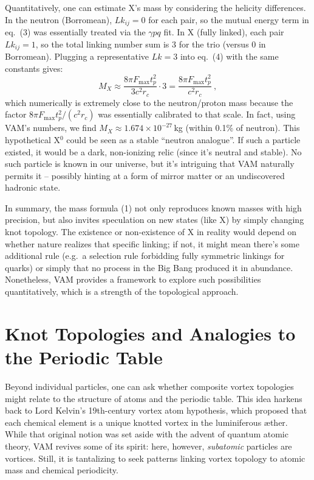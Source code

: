 \documentclass[a4paper,12pt]{article}
\begin{document}
        Quantitatively, one can estimate X's mass by considering the helicity differences. In the neutron (Borromean), $Lk_{ij}=0$ for each pair, so the mutual energy term in eq.~(3) was essentially treated via the $\gamma p q$ fit. In X (fully linked), each pair $Lk_{ij}=1$, so the total linking number sum is 3 for the trio (versus 0 in Borromean). Plugging a representative $Lk=3$ into eq.~(4) with the same constants gives:
        \[
        M_X \approx \frac{8\pi F_{\max} t_p^2}{3c^2 r_c} \cdot 3 = \frac{8\pi F_{\max} t_p^2}{c^2 r_c}~,
        \]
        which numerically is extremely close to the neutron/proton mass because the factor $8\pi F_{\max} t_p^2/(c^2 r_c)$ was essentially calibrated to that scale. In fact, using VAM's numbers, we find $M_X \approx 1.674\times10^{-27}$\,kg (within 0.1\% of neutron). This hypothetical X$^0$ could be seen as a stable ``neutron analogue''. If such a particle existed, it would be a dark, non-ionizing relic (since it's neutral and stable). No such particle is known in our universe, but it's intriguing that VAM naturally permits it -- possibly hinting at a form of mirror matter or an undiscovered hadronic state.
        
        In summary, the mass formula (1) not only reproduces known masses with high precision, but also invites speculation on new states (like X) by simply changing knot topology. The existence or non-existence of X in reality would depend on whether nature realizes that specific linking; if not, it might mean there's some additional rule (e.g.\ a selection rule forbidding fully symmetric linkings for quarks) or simply that no process in the Big Bang produced it in abundance. Nonetheless, VAM provides a framework to explore such possibilities quantitatively, which is a strength of the topological approach.
        
        \section{Knot Topologies and Analogies to the Periodic Table}
        
        Beyond individual particles, one can ask whether composite vortex topologies might relate to the structure of atoms and the periodic table. This idea harkens back to Lord Kelvin's 19th-century vortex atom hypothesis, which proposed that each chemical element is a unique knotted vortex in the luminiferous æther. While that original notion was set aside with the advent of quantum atomic theory, VAM revives some of its spirit: here, however, \textit{subatomic} particles are vortices. Still, it is tantalizing to seek patterns linking vortex topology to atomic mass and chemical periodicity.
        
\end{document}
